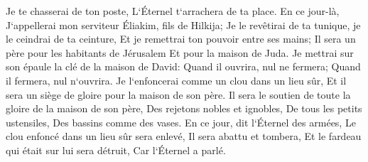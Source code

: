 \verse Je te chasserai de ton poste, L`Éternel t`arrachera de ta place. 
\verse En ce jour-là, J`appellerai mon serviteur Éliakim, fils de Hilkija; 
\verse Je le revêtirai de ta tunique, je le ceindrai de ta ceinture, Et je remettrai ton pouvoir entre ses mains; Il sera un père pour les habitants de Jérusalem Et pour la maison de Juda. 
\verse Je mettrai sur son épaule la clé de la maison de David: Quand il ouvrira, nul ne fermera; Quand il fermera, nul n`ouvrira. 
\verse Je l`enfoncerai comme un clou dans un lieu sûr, Et il sera un siège de gloire pour la maison de son père. 
\verse Il sera le soutien de toute la gloire de la maison de son père, Des rejetons nobles et ignobles, De tous les petits ustensiles, Des bassins comme des vases. 
\verse En ce jour, dit l`Éternel des armées, Le clou enfoncé dans un lieu sûr sera enlevé, Il sera abattu et tombera, Et le fardeau qui était sur lui sera détruit, Car l`Éternel a parlé. 

